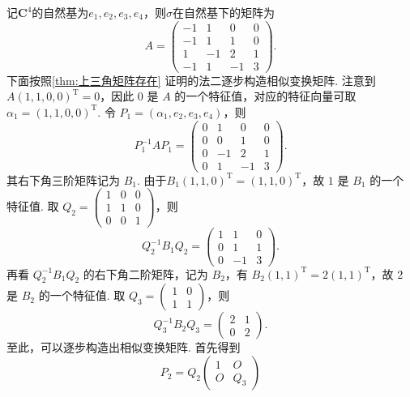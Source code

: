 \begin{solution}
    记$\mathbf{C}^4$的自然基为$e_1,e_2,e_3,e_4$，则$\sigma$在自然基下的矩阵为
    \[
        A=\begin{pmatrix}
            -1 & 1  & 0  & 0 \\
            -1 & 1  & 1  & 0 \\
            1  & -1 & 2  & 1 \\
            -1 & 1  & -1 & 3
        \end{pmatrix}.
    \]
    下面按照\autoref{thm:上三角矩阵存在} 证明的法二逐步构造相似变换矩阵. 注意到 $A(1,1,0,0)^\mathrm{T} = 0$，因此 $0$ 是 $A$ 的一个特征值，对应的特征向量可取 $\alpha_1=(1,1,0,0)^\mathrm{T}$. 令 $P_1 = (\alpha_1,e_2,e_3,e_4)$，则
    \[ P_1^{-1}AP_1 = \begin{pmatrix}
            0 & 1  & 0  & 0 \\
            0 & 0  & 1  & 0 \\
            0 & -1 & 2  & 1 \\
            0 & 1  & -1 & 3
        \end{pmatrix}. \]
    其右下角三阶矩阵记为 $B_1$. 由于$B_1(1,1,0)^\mathrm{T} = (1,1,0)^\mathrm{T}$，故 $1$ 是 $B_1$ 的一个特征值. 取 $Q_2 = \begin{pmatrix}
            1 & 0 & 0 \\
            1 & 1 & 0 \\
            0 & 0 & 1
        \end{pmatrix}$，则
    \[
        Q_2^{-1}B_1Q_2
        =
        \begin{pmatrix}
            1 & 1  & 0 \\
            0 & 1  & 1 \\
            0 & -1 & 3
        \end{pmatrix}.
    \]
    再看 $Q_2^{-1}B_1Q_2$ 的右下角二阶矩阵，记为 $B_2$，有 $B_2(1,1)^\mathrm{T} = 2(1,1)^\mathrm{T}$，故 $2$ 是 $B_2$ 的一个特征值. 取 $Q_3= \begin{pmatrix}
            1 & 0 \\
            1 & 1
        \end{pmatrix}$，则
    \[
        Q_3^{-1}B_2Q_3
        =
        \begin{pmatrix}
            2 & 1 \\
            0 & 2
        \end{pmatrix}.
    \]
    至此，可以逐步构造出相似变换矩阵. 首先得到
    \[
        P_2 = Q_2
        \begin{pmatrix}
            1 & O \\ O & Q_3

\end{pmatrix}\]
\end{solution}
